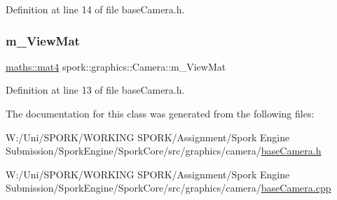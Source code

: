 Definition at line 14 of file base\+Camera.\+h.

\mbox{\label{classspork_1_1graphics_1_1_camera_a0a91145642b7dac5bafee0c983c6b4a9}} 
\subsubsection{\texorpdfstring{m\+\_\+\+View\+Mat}{m\_ViewMat}}
{\footnotesize\ttfamily \hyperlink{structspork_1_1maths_1_1mat4}{maths\+::mat4} spork\+::graphics\+::\+Camera\+::m\+\_\+\+View\+Mat\hspace{0.3cm}{\ttfamily [protected]}}



Definition at line 13 of file base\+Camera.\+h.



The documentation for this class was generated from the following files\+:\begin{DoxyCompactItemize}
\item 
W\+:/\+Uni/\+S\+P\+O\+R\+K/\+W\+O\+R\+K\+I\+N\+G S\+P\+O\+R\+K/\+Assignment/\+Spork Engine Submission/\+Spork\+Engine/\+Spork\+Core/src/graphics/camera/\hyperlink{base_camera_8h}{base\+Camera.\+h}\item 
W\+:/\+Uni/\+S\+P\+O\+R\+K/\+W\+O\+R\+K\+I\+N\+G S\+P\+O\+R\+K/\+Assignment/\+Spork Engine Submission/\+Spork\+Engine/\+Spork\+Core/src/graphics/camera/\hyperlink{base_camera_8cpp}{base\+Camera.\+cpp}\end{DoxyCompactItemize}
